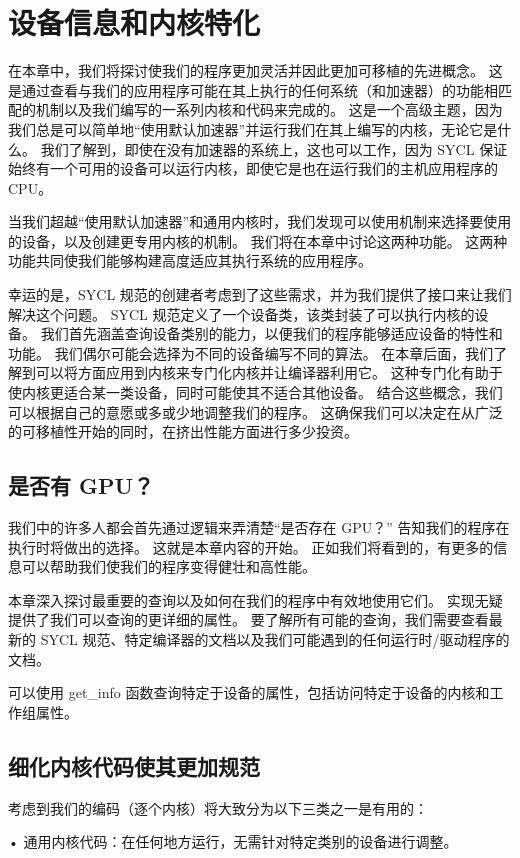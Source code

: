 \section{设备信息和内核特化}
在本章中，我们将探讨使我们的程序更加灵活并因此更加可移植的先进概念。 这是通过查看与我们的应用程序可能在其上执行的任何系统（和加速器）的功能相匹配的机制以及我们编写的一系列内核和代码来完成的。 这是一个高级主题，因为我们总是可以简单地“使用默认加速器”并运行我们在其上编写的内核，无论它是什么。 我们了解到，即使在没有加速器的系统上，这也可以工作，因为 SYCL 保证始终有一个可用的设备可以运行内核，即使它是也在运行我们的主机应用程序的 CPU。

当我们超越“使用默认加速器”和通用内核时，我们发现可以使用机制来选择要使用的设备，以及创建更专用内核的机制。 我们将在本章中讨论这两种功能。 这两种功能共同使我们能够构建高度适应其执行系统的应用程序。

幸运的是，SYCL 规范的创建者考虑到了这些需求，并为我们提供了接口来让我们解决这个问题。 SYCL 规范定义了一个设备类，该类封装了可以执行内核的设备。 我们首先涵盖查询设备类别的能力，以便我们的程序能够适应设备的特性和功能。 我们偶尔可能会选择为不同的设备编写不同的算法。 在本章后面，我们了解到可以将方面应用到内核来专门化内核并让编译器利用它。 这种专门化有助于使内核更适合某一类设备，同时可能使其不适合其他设备。 结合这些概念，我们可以根据自己的意愿或多或少地调整我们的程序。 这确保我们可以决定在从广泛的可移植性开始的同时，在挤出性能方面进行多少投资。

\subsection{是否有 GPU？}
我们中的许多人都会首先通过逻辑来弄清楚“是否存在 GPU？” 告知我们的程序在执行时将做出的选择。 这就是本章内容的开始。 正如我们将看到的，有更多的信息可以帮助我们使我们的程序变得健壮和高性能。

本章深入探讨最重要的查询以及如何在我们的程序中有效地使用它们。 实现无疑提供了我们可以查询的更详细的属性。 要了解所有可能的查询，我们需要查看最新的 SYCL 规范、特定编译器的文档以及我们可能遇到的任何运行时/驱动程序的文档。

可以使用 get\_info 函数查询特定于设备的属性，包括访问特定于设备的内核和工作组属性。

\subsection{细化内核代码使其更加规范}
考虑到我们的编码（逐个内核）将大致分为以下三类之一是有用的：

• 通用内核代码：在任何地方运行，无需针对特定类别的设备进行调整。


